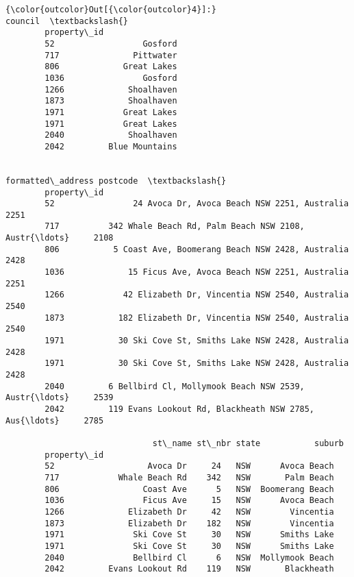 \documentclass[11pt]{article}
\begin{document}
\begin{Verbatim}[commandchars=\\\{\}]
{\color{outcolor}Out[{\color{outcolor}4}]:}                     council  \textbackslash{}
        property\_id                   
        52                  Gosford   
        717               Pittwater   
        806             Great Lakes   
        1036                Gosford   
        1266             Shoalhaven   
        1873             Shoalhaven   
        1971            Great Lakes   
        1971            Great Lakes   
        2040             Shoalhaven   
        2042         Blue Mountains   
        
                                                     formatted\_address postcode  \textbackslash{}
        property\_id                                                               
        52                24 Avoca Dr, Avoca Beach NSW 2251, Australia     2251   
        717          342 Whale Beach Rd, Palm Beach NSW 2108, Austr{\ldots}     2108   
        806           5 Coast Ave, Boomerang Beach NSW 2428, Australia     2428   
        1036             15 Ficus Ave, Avoca Beach NSW 2251, Australia     2251   
        1266            42 Elizabeth Dr, Vincentia NSW 2540, Australia     2540   
        1873           182 Elizabeth Dr, Vincentia NSW 2540, Australia     2540   
        1971           30 Ski Cove St, Smiths Lake NSW 2428, Australia     2428   
        1971           30 Ski Cove St, Smiths Lake NSW 2428, Australia     2428   
        2040         6 Bellbird Cl, Mollymook Beach NSW 2539, Austr{\ldots}     2539   
        2042         119 Evans Lookout Rd, Blackheath NSW 2785, Aus{\ldots}     2785   
        
                              st\_name st\_nbr state           suburb  
        property\_id                                                  
        52                   Avoca Dr     24   NSW      Avoca Beach  
        717            Whale Beach Rd    342   NSW       Palm Beach  
        806                 Coast Ave      5   NSW  Boomerang Beach  
        1036                Ficus Ave     15   NSW      Avoca Beach  
        1266             Elizabeth Dr     42   NSW        Vincentia  
        1873             Elizabeth Dr    182   NSW        Vincentia  
        1971              Ski Cove St     30   NSW      Smiths Lake  
        1971              Ski Cove St     30   NSW      Smiths Lake  
        2040              Bellbird Cl      6   NSW  Mollymook Beach  
        2042         Evans Lookout Rd    119   NSW       Blackheath  
\end{Verbatim}
            
\end{document}
